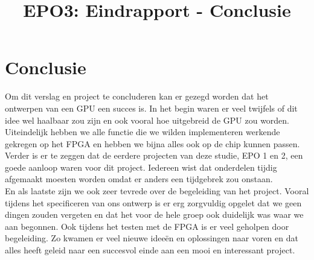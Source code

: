 \documentclass{scrartcl} %
\author{}
\title{EPO3: Eindrapport - Conclusie}
\begin{document}
\chapter{Conclusie}
\label{ch:conclusie}

Om dit verslag en project te concluderen kan er gezegd worden dat het ontwerpen van een GPU een succes is. In het begin waren er veel twijfels of dit idee wel haalbaar zou zijn en ook vooral hoe uitgebreid de GPU zou worden. Uiteindelijk hebben we alle functie die we wilden implementeren werkende gekregen op het FPGA en hebben we bijna alles ook op de chip kunnen passen.\\
Verder is er te zeggen dat de eerdere projecten van deze studie, EPO 1 en 2, een goede aanloop waren voor dit project. Iedereen wist dat onderdelen tijdig afgemaakt moesten worden omdat er anders een tijdgebrek zou onstaan.\\
En als laatste zijn we ook zeer tevrede over de begeleiding van het project. Vooral tijdens het specificeren van ons ontwerp is er erg zorgvuldig opgelet dat we geen dingen zouden vergeten en dat het voor de hele groep ook duidelijk was waar we aan begonnen. Ook tijdens het testen met de FPGA is er veel geholpen door begeleiding. Zo kwamen er veel nieuwe ideeën en oplossingen naar voren en dat alles heeft geleid naar een succesvol einde aan een mooi en interessant project.
\end{document}
